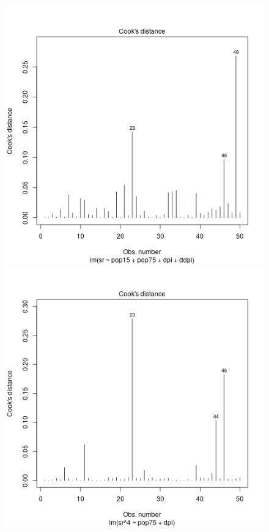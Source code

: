 \begin{figure}[p]
  \begin{center}
    \includegraphics[scale=0.48]{imgR/plot14.png} \hspace*{2cm}
	\includegraphics[scale=0.48]{imgR/plot24.png} \\

\end{center}
\end{figure}
